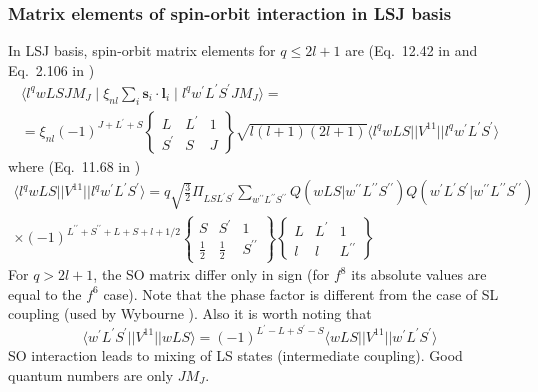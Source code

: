 \documentclass[a4paper,oneside,12pt]{extarticle}
\def \dprime {\prime\prime}
\begin{document}
\subsubsection {Matrix elements of spin-orbit interaction in LSJ basis}
\label{ssec:SO}
%
In LSJ basis, spin-orbit matrix elements for $q\leq 2l+1$ are (Eq.~12.42 in \cite{Cowan} and Eq.~2.106 in \cite{Wybourne})
\begin{multline}
\langle l^q wLSJM_J \mid \xi_{nl} \sum_i \mathbf{s}_i \cdot \mathbf{l}_i \mid l^q w^{\prime}L^{\prime}S^{\prime}JM_J \rangle = \\ =
\xi_{nl} (-1)^{J+L^{\prime}+S}
\left \{
\begin{array}{ccc}
L & L^{\prime} & 1 \\
S^{\prime} & S & J
\end{array}
\right \}
\sqrt{l(l+1)(2l+1)}
\langle l^q wLS || V^{11} || l^q w^{\prime}L^{\prime}S^{\prime} \rangle
\end{multline}
%
where (Eq.~11.68 in \cite{Cowan})
\begin{multline}
\langle l^q wLS || V^{11} || l^q w^{\prime}L^{\prime}S^{\prime} \rangle = 
q \sqrt{\frac{3}{2}} \Pi_{LSL^{\prime}S^{\prime}} 
\sum_{w^{\dprime}L^{\dprime}S^{\dprime}} Q(wLS|w^{\dprime}L^{\dprime}S^{\dprime})
Q(w^{\prime}L^{\prime}S^{\prime}|w^{\dprime}L^{\dprime}S^{\dprime}) \\ \times
(-1)^{L^{\dprime}+S^{\dprime}+L+S+l+1/2}
\left \{
\begin{array}{ccc}
S & S^{\prime} & 1 \\
\frac{1}{2} & \frac{1}{2} & S^{\dprime}
\end{array}
\right \}
\left \{
\begin{array}{ccc}
L & L^{\prime} & 1 \\
l & l & L^{\dprime}
\end{array}
\right \}
\end{multline}
%
For $q> 2l+1$, the SO matrix differ only in sign (for $f^8$ its absolute values are equal to the $f^6$ case). Note that the phase factor is different from the case of SL coupling (used by Wybourne \cite{Wybourne}). Also it is worth noting that
$$
\langle w^{\prime}L^{\prime}S^{\prime} || V^{11} || wLS \rangle = 
(-1)^{L^{\prime}-L+S^{\prime}-S} \langle wLS || V^{11} || w^{\prime}L^{\prime}S^{\prime} \rangle
$$
%
SO interaction leads to mixing of LS states (intermediate coupling). Good quantum numbers are only $JM_J$.
%
\end{document}
